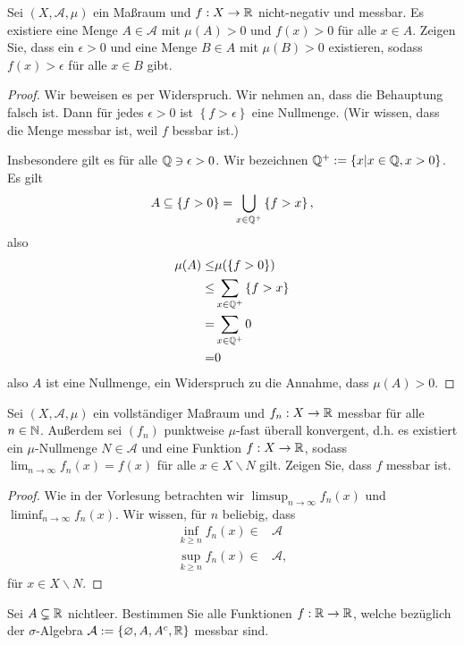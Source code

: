 
\begin{Problem}
	Sei $(X,\mathcal{A},\mu)$ ein Maßraum und $f:X\to \mathbb{R}$ nicht-negativ und messbar. Es existiere eine Menge $A\in \mathcal{A}$ mit $\mu(A)>0$ und $f(x)>0$ f\"{u}r alle $x\in A$. Zeigen Sie, dass ein $\epsilon>0$ und eine Menge $B\in A$ mit $\mu(B)>0$ existieren, sodass $f(x)>\epsilon$ f\"{u}r alle $x\in B$ gibt.
\end{Problem}

\begin{proof}
	Wir beweisen es per Widerspruch. Wir nehmen an, dass die Behauptung falsch ist. Dann f\"{u}r jedes $\epsilon>0$ ist $\left\{ f>\epsilon \right\} $ eine Nullmenge. (Wir wissen, dass die Menge messbar ist, weil $f$ bessbar ist.)

	Insbesondere gilt es f\"{u}r alle $\mathbb{Q}\ni \epsilon >0$. Wir bezeichnen $\mathbb{Q}^+:=\left\{ x|x\in \mathbb{Q}, x>0 \right\} $. Es gilt
	\[
	A\subseteq \left\{ f>0 \right\} =\bigcup_{x\in \mathbb{Q}^+} \left\{ f>x \right\} 
,\] 
also
\begin{align*}
	\mu(A)\le& \mu(\left\{ f>0 \right\} )\\
	\le& \sum_{x\in \mathbb{Q}^+} \left\{ f>x \right\} \\
	=& \sum_{x\in \mathbb{Q}^+} 0\\
	=& 0
\end{align*}
also $A$ ist eine Nullmenge, ein Widerspruch zu die Annahme, dass $\mu(A)>0$.
\end{proof}
\begin{Problem}
	Sei $(X,\mathcal{A},\mu)$ ein vollst\"{a}ndiger Maßraum und $f_n:X\to \mathbb{R}$ messbar f\"{u}r alle $n\in \mathbb{N}$. Außerdem sei $(f_n)$ punktweise $\mu$-fast überall konvergent, d.h. es existiert ein $\mu$-Nullmenge $N\in \mathcal{A}$ und eine Funktion $f:X\to \mathbb{R}$, sodass $\lim_{n \to \infty} f_n(x)=f(x)$ f\"{u}r alle $x\in X\backslash N$ gilt. Zeigen Sie, dass $f$ messbar ist.
\end{Problem}
\begin{proof}
	Wie in der Vorlesung betrachten wir $\limsup_{n\to\infty} f_n(x)$ und $\liminf_{n\to \infty} f_n(x)$. Wir wissen, f\"{u}r $n$ beliebig, dass
	\begin{align*}
		\inf_{k\ge n}f_n(x)\in& \mathcal{A}\\
		\sup_{k\ge n}f_n(x)\in& \mathcal{A},
	\end{align*}
	f\"{u}r $x\in X\backslash N$. 
\end{proof}
\begin{Problem}
	Sei $A\subsetneq \mathbb{R}$ nichtleer. Bestimmen Sie alle Funktionen $f:\mathbb{R}\to \mathbb{R}$, welche bezüglich der $\sigma$-Algebra $\mathcal{A}:=\left\{ \varnothing, A,A^c, \mathbb{R} \right\} $ messbar sind.
\end{Problem}
